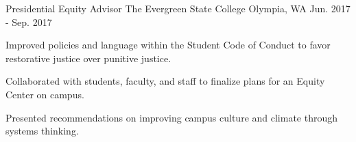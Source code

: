 \begin{cventries}
  \cventry
    {Presidential Equity Advisor} %
    {The Evergreen State College} %
    {Olympia, WA} %
    {Jun. 2017 - Sep. 2017} %
    {
      \begin{cvitems} %
        \item {Improved policies and language within the Student Code of Conduct to favor restorative justice over punitive justice.}
        \item {Collaborated with students, faculty, and staff to finalize plans for an Equity Center on campus.}
        \item {Presented recommendations on improving campus culture and climate through systems thinking.}
      \end{cvitems}
    }

\end{cventries}

